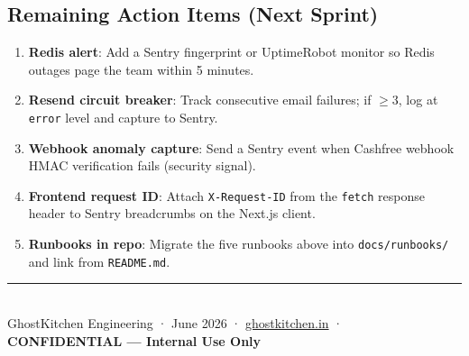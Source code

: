\documentclass[12pt,a4paper]{article}
\begin{document}
\subsection{Remaining Action Items (Next Sprint)}

\begin{enumerate}[leftmargin=*]
  \item \textbf{Redis alert}: Add a Sentry fingerprint or UptimeRobot monitor
        so Redis outages page the team within 5 minutes.
  \item \textbf{Resend circuit breaker}: Track consecutive email failures; if $\geq 3$,
        log at \texttt{error} level and capture to Sentry.
  \item \textbf{Webhook anomaly capture}: Send a Sentry event when Cashfree webhook
        HMAC verification fails (security signal).
  \item \textbf{Frontend request ID}: Attach \texttt{X-Request-ID} from the
        \texttt{fetch} response header to Sentry breadcrumbs on the Next.js client.
  \item \textbf{Runbooks in repo}: Migrate the five runbooks above into
        \texttt{docs/runbooks/} and link from \texttt{README.md}.
\end{enumerate}

\vfill
\begin{center}
{\color{brand}\rule{0.5\linewidth}{2pt}}\\[0.4em]
{\small\color{muted}
GhostKitchen Engineering · June 2026 ·
\href{https://ghostkitchen.in}{ghostkitchen.in} ·
\textbf{CONFIDENTIAL — Internal Use Only}
}
\end{center}
\end{document}
